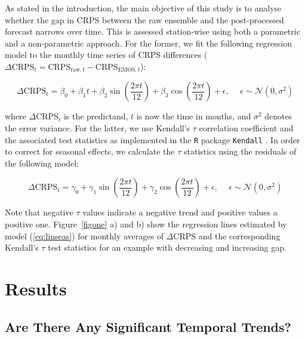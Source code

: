 As stated in the introduction, the main objective of this study is to
analyse whether the gap in CRPS between the raw ensemble and the
post-processed forecast narrows over time. This is assessed
station-wise using both a parametric and a non-parametric approach.
For the former, we fit the following regression model to the monthly
time series of CRPS differences ($\Delta \mathrm{CRPS}_{t} =
\mathrm{CRPS}_{\mathrm{raw},t} - \mathrm{CRPS}_{\mathrm{EMOS}, t}$):
\begin{linenomath*}
\begin{equation}
\Delta \mathrm{CRPS}_{t} = \beta_{0} + \beta_{1} t + \beta_{2} \sin\left(\frac{2\pi t}{12}\right) + \beta_{3} \cos\left(\frac{2\pi t}{12} \right) + \epsilon, \phantom{bla} \epsilon \sim \mathcal{N}(0, \sigma^{2}) \label{eq:linseas}
\end{equation}
\end{linenomath*}
where $\Delta \mathrm{CRPS}_{t}$ is the predictand, $t$ is now the
time in months, and $\sigma^{2}$ denotes the error variance. For the
latter, we use Kendall's $\tau$ correlation coefficient and the
associated test statistics \citep{Mann45} as implemented in the
\texttt{R} package \texttt{Kendall} \citep{Kendall}. In order to
correct for seasonal effects, we calculate the $\tau$ statistics using
the residuals of the following model:
\begin{linenomath*}
\begin{equation}
\Delta \mathrm{CRPS}_{t} = \gamma_{0} + \gamma_{1} \sin\left(\frac{2\pi t}{12}\right) + \gamma_{2} \cos\left(\frac{2\pi t}{12} \right) + \epsilon, \phantom{bla} \epsilon \sim \mathcal{N}(0, \sigma^{2})
\label{eq:tauseas}
\end{equation}
\end{linenomath*}
Note that negative $\tau$ values indicate a negative trend and
positive values a positive one. Figure~\ref{figone} a) and b)
show the regression lines estimated by model (\ref{eq:linseas}) for
monthly averages of $\Delta \mathrm{CRPS}$ and the corresponding
Kendall's $\tau$ test statistics for an example with decreasing and
increasing gap.


\section{Results}
\label{sec:res}

\subsection{Are There Any Significant Temporal Trends?}


